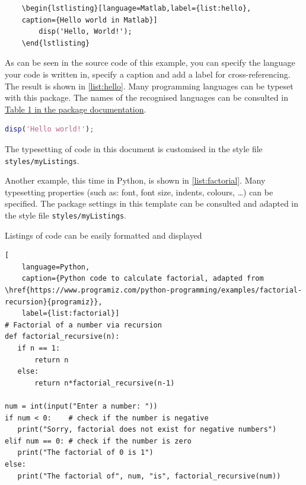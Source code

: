 \begin{verbatim}
    \begin{lstlisting}[language=Matlab,label={list:hello},
    caption={Hello world in Matlab}]
        disp('Hello, World!');    
    \end{lstlisting}
\end{verbatim}

As can be seen in the source code of this example, you can specify the language your code is written in, specify a caption and add a label for cross-referencing. The result is shown in \cref{list:hello}. Many programming languages can be typeset with this package. The names of the recognised languages can be consulted in \href{https://mirror.lyrahosting.com/CTAN/macros/latex/contrib/listings/listings.pdf}{Table 1 in the package documentation}.

\begin{lstlisting}[language=Matlab,label={list:hello},caption={Hello world in Matlab}]
disp('Hello world!');  
\end{lstlisting}

The typesetting of code in this document is customised in the style file \verb|styles/myListings|.

Another example, this time in Python, is shown in \cref{list:factorial}. Many typesetting properties (such as: font, font size, indents, colours, \dots) can be specified. The package settings in this template can be consulted and adapted in the style file \texttt{styles/myListings}.

\begin{frame}[fragile]{Listings of code can be easily formatted and displayed}
\begin{lstlisting}[
    language=Python,
    caption={Python code to calculate factorial, adapted from \href{https://www.programiz.com/python-programming/examples/factorial-recursion}{programiz}},
    label={list:factorial}]
# Factorial of a number via recursion
def factorial_recursive(n):
   if n == 1:
       return n
   else:
       return n*factorial_recursive(n-1)

num = int(input("Enter a number: "))
if num < 0:    # check if the number is negative
   print("Sorry, factorial does not exist for negative numbers")
elif num == 0: # check if the number is zero
   print("The factorial of 0 is 1")
else:
   print("The factorial of", num, "is", factorial_recursive(num))
\end{lstlisting}
\end{frame}

